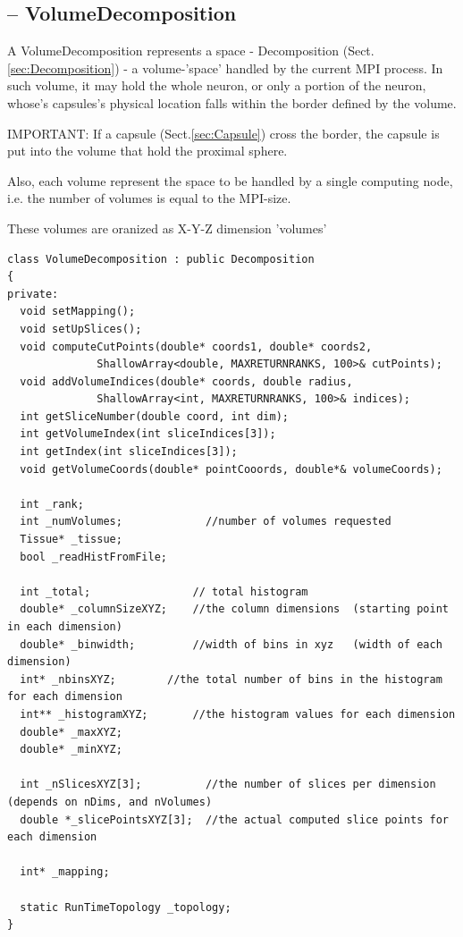 \subsection{-- VolumeDecomposition}
\label{sec:VolumeDecomposition}

 A VolumeDecomposition represents a space - Decomposition
 (Sect.\ref{sec:Decomposition}) - a volume-'space' handled by the current MPI
 process. In such volume, it may hold the whole neuron, or only a portion of the
 neuron, whose's capsules's physical location falls within the border defined by
 the volume.
 
 IMPORTANT: If a capsule (Sect.\ref{sec:Capsule}) cross the border, the capsule
 is put into the volume that hold the proximal sphere.
 
Also, each volume represent the space to be handled by a single computing node,
i.e. the number of volumes is equal to the MPI-size.
 
These volumes are oranized as X-Y-Z dimension 'volumes'
\begin{lstlisting}
class VolumeDecomposition : public Decomposition
{
private:
  void setMapping();
  void setUpSlices();
  void computeCutPoints(double* coords1, double* coords2, 
              ShallowArray<double, MAXRETURNRANKS, 100>& cutPoints);
  void addVolumeIndices(double* coords, double radius, 
              ShallowArray<int, MAXRETURNRANKS, 100>& indices);
  int getSliceNumber(double coord, int dim);
  int getVolumeIndex(int sliceIndices[3]);
  int getIndex(int sliceIndices[3]);
  void getVolumeCoords(double* pointCooords, double*& volumeCoords);
    
  int _rank;
  int _numVolumes;             //number of volumes requested
  Tissue* _tissue;
  bool _readHistFromFile;

  int _total;                // total histogram
  double* _columnSizeXYZ;    //the column dimensions  (starting point in each dimension)
  double* _binwidth;         //width of bins in xyz   (width of each dimension)
  int* _nbinsXYZ;	     //the total number of bins in the histogram for each dimension
  int** _histogramXYZ;       //the histogram values for each dimension
  double* _maxXYZ;
  double* _minXYZ;

  int _nSlicesXYZ[3];	       //the number of slices per dimension (depends on nDims, and nVolumes)
  double *_slicePointsXYZ[3];  //the actual computed slice points for each dimension

  int* _mapping;

  static RunTimeTopology _topology;
}
\end{lstlisting}

